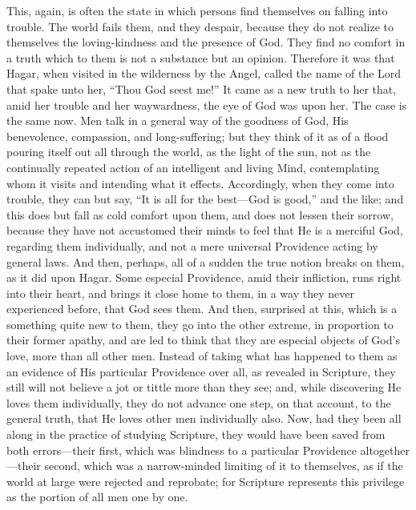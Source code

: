 This, again, is often the state in which persons find themselves on
falling into trouble. The world fails them, and they despair, because
they do not realize to themselves the loving-kindness and the presence
of God. They find no comfort in a truth which to them is not a
substance but an opinion. Therefore it was that Hagar, when visited in
the wilderness by the Angel, called the name of the Lord that spake
unto her, ``Thou God seest me!'' It came as a new truth to her
that, amid her trouble and her waywardness, the eye of God was upon
her. The case is the same now. Men talk in a general way of the
goodness of God, His benevolence, compassion, and long-suffering; but
they think of it as of a flood pouring itself out all through the
world, as the light of the sun, not as the continually repeated action
of an intelligent and living Mind, contemplating whom it visits and
intending what it effects. Accordingly, when they come into trouble,
they can but say, ``It is all for the best—God is good,''
and the like; and this does but fall as cold comfort upon them, and
does not lessen their sorrow, because they have not accustomed their
minds to feel that He is a merciful God, regarding them individually,
and not a mere universal Providence acting by general laws. And then,
perhaps, all of a sudden the true notion breaks on them, as it did
upon Hagar. Some especial Providence, amid their infliction, runs
right into their heart, and brings it close home to them, in a way
they never experienced before, that God sees them. And then, surprised
at this, which is a something quite new to them, they go into the
other extreme, in proportion to their former apathy, and are led to
think that they are especial objects of God's love, more than all
other men. Instead of taking what has happened to them as an evidence
of His particular Providence over all, as revealed in Scripture, they
still will not believe a jot or tittle more than they see; and, while
discovering He loves them individually, they do not advance one step,
on that account, to the general truth, that He loves other men
individually also. Now, had they been all along in the practice of
studying Scripture, they would have been saved from both errors—their
first, which was blindness to a particular Providence altogether—their
second, which was a narrow-minded limiting of it to themselves, as if
the world at large were rejected and reprobate; for Scripture
represents this privilege as the portion of all men one by one.

